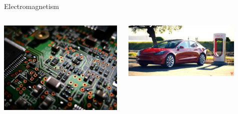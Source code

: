 \begin{frame}{Electromagnetism}
\begin{columns}
     \begin{column}{0.25\textwidth}
       \begin{center}
          \includegraphics[width=0.99\textwidth]{./images/misc/circuit_1.jpg}\\
       \end{center}
      \end{column}
      \begin{column}{0.45\textwidth}
        \begin{center}
          \includegraphics[width=0.90\textwidth]{./images/misc/tesla_1.jpg}\\
        \end{center}
      \end{column}
      \begin{column}{0.30\textwidth}
        \begin{center}

\end{center}
\end{column}
\end{columns}
\end{frame}
